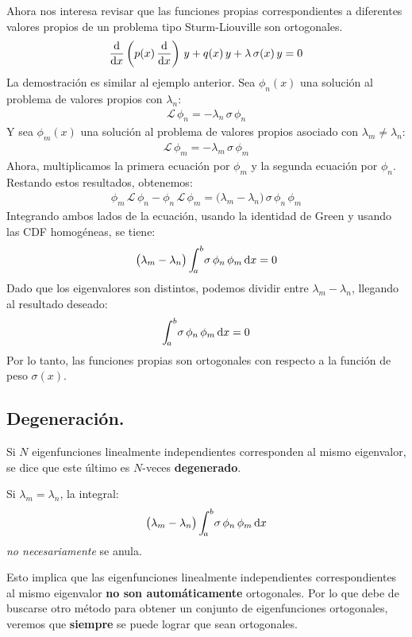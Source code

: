\documentclass[12pt]{article}
\def\scaleint#1{\vcenter{\hbox{\scaleto[3ex]{\displaystyle\int}{#1}}}}
\def\bs{\mkern-12mu}
\numberwithin{equation}{section}
\begin{document}
Ahora nos interesa revisar que las funciones propias correspondientes a diferentes valores propios de un problema tipo Sturm-Liouville son ortogonales.
\begin{align*}
\dv{x} \left( p(x) \, \dv{x} \right) \, y + q(x) \, y + \lambda \, \sigma (x) \, y = 0
\end{align*}
La demostración es similar al ejemplo anterior. Sea $\phi_{n}(x)$ una solución al problema de valores propios con $\lambda_{n}$:
\begin{align*}
\mathcal{L} \, \phi_{n} = - \lambda_{n} \, \sigma \, \phi_{n}
\end{align*}
Y sea $\phi_{m}(x)$ una solución al problema de valores propios asociado con $\lambda_{m} \neq \lambda_{n}$:
\begin{align*}
\mathcal{L} \, \phi_{m} = - \lambda_{m} \, \sigma \, \phi_{m}
\end{align*}
Ahora, multiplicamos la primera ecuación por $\phi_{m}$ y la segunda ecuación por $\phi_{n}$. Restando estos resultados, obtenemos:
\begin{align*}
\phi_{m}\, \mathcal{L} \, \phi_{n} - \phi_{n} \, \mathcal{L} \, \phi_{m} = \big( \lambda_{m} - \lambda_{n} \big) \, \sigma \, \phi_{n} \, \phi_{m}
\end{align*}
Integrando ambos lados de la ecuación, usando la identidad de Green y usando las CDF homogéneas, se tiene:
\begin{align*}
\big( \lambda_{m} - \lambda_{n} \big) \, \scaleint{5ex}_{\bs a}^{b} \sigma \, \phi_{n} \, \phi_{m} \dd{x} = 0
\end{align*}
Dado que los eigenvalores son distintos, podemos dividir entre $\lambda_{m} - \lambda_{n}$, llegando al resultado deseado:
\begin{align*}
\scaleint{5ex}_{\bs a}^{b} \sigma \, \phi_{n} \, \phi_{m} \dd{x} = 0
\end{align*}
Por lo tanto, las funciones propias son ortogonales con respecto a la función de peso $\sigma(x)$.

\subsection{Degeneración.}

Si $N$ eigenfunciones linealmente independientes corresponden al mismo eigenvalor, se dice que este último es $N$-veces \textbf{degenerado}.
\par
Si $\lambda_{m} = \lambda_{n}$, la integral:
\begin{align*}
\big( \lambda_{m} - \lambda_{n} \big) \, \scaleint{5ex}_{\bs a}^{b} \sigma \, \phi_{n} \, \phi_{m} \dd{x}
\end{align*}
\emph{no necesariamente} se anula.
\par
Esto implica que las eigenfunciones linealmente independientes correspondientes al mismo eigenvalor \textbf{no son automáticamente} ortogonales. Por lo que debe de buscarse otro método para obtener un conjunto de eigenfunciones ortogonales,  veremos que \textbf{siempre} se puede lograr que sean ortogonales.
\end{document}
